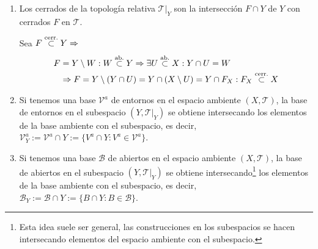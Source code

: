 \begin{obs}
\begin{enumerate}
    \item Los cerrados de la topología relativa $\mathcal{T}|_Y$ son la intersección $F\cap Y$ de $Y$ con cerrados $F$ en $\mathcal{T}$.
    \begin{demo}
    Sea $F \stackrel{\text{cerr.}}{\subset} Y \Rightarrow$
    \begin{align*}
    F &= Y\setminus W : W \stackrel{\text{ab.}}{\subset} Y \Rightarrow \exists U \stackrel{\text{ab.}}{\subset} X : Y\cap U = W\\    
    &\Rightarrow F = Y \setminus (Y \cap U) = Y \cap  (X\setminus U) = Y \cap F_X : F_X \stackrel{\text{cerr.}}{\subset} X
    \end{align*}
    \end{demo}

    \item Si tenemos una base $\mathcal{V}^a$ de entornos en el espacio ambiente $(X,\mathcal{T})$, la base de entornos en el subespacio $(Y,\mathcal{T}|_Y)$ se obtiene intersecando los elementos de la base ambiente con el subespacio, es decir, $\mathcal{V}^a_Y := \mathcal{V}^a \cap Y := \{V^a \cap Y : V^a \in \mathcal{V}^a\}$.

    \item Si tenemos una base $\mathcal{B}$ de abiertos en el espacio ambiente $(X,\mathcal{T})$, la base de abiertos en el subespacio $(Y,\mathcal{T}|_Y)$ se obtiene intersecando\footnote{Esta idea suele ser general, las construcciones en los subespacios se hacen intersecando elementos del espacio ambiente con el subespacio.} los elementos de la base ambiente con el subespacio, es decir, $\mathcal{B}_Y := \mathcal{B} \cap Y := \{B \cap Y : B \in \mathcal{B}\}$.
\end{enumerate}
\end{obs}


